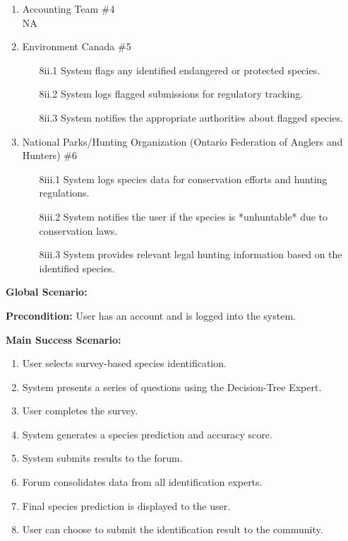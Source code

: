 \documentclass[]{article}
\begin{document}
\begin{enumerate}[{\bf BE1.}]
\begin{enumerate}[{\bf VP1.}]
    \item Accounting Team \#4 \\
    \newline NA

    \item Environment Canada \#5 \\
    \begin{enumerate}
        \item[8ii.1] System flags any identified endangered or protected species.
        \item[8ii.2] System logs flagged submissions for regulatory tracking.
        \item[8ii.3] System notifies the appropriate authorities about flagged species.
    \end{enumerate}

    \item National Parks/Hunting Organization (Ontario Federation of Anglers and Hunters) \#6 \\
    \begin{enumerate}
        \item [8iii.1] System logs species data for conservation efforts and hunting regulations.
        \item [8iii.2] System notifies the user if the species is *unhuntable* due to conservation laws.
        \item [8iii.3] System provides relevant legal hunting information based on the identified species.
    \end{enumerate}
\end{enumerate}

\textbf{Global Scenario:}

\textbf{Precondition:} User has an account and is logged into the system.

\textbf{Main Success Scenario:}
\begin{enumerate}
    \item User selects survey-based species identification.
    \item System presents a series of questions using the Decision-Tree Expert.
    \item User completes the survey.
    \item System generates a species prediction and accuracy score.
    \item System submits results to the forum.
    \item Forum consolidates data from all identification experts.
    \item Final species prediction is displayed to the user.
    \item User can choose to submit the identification result to the community.
\end{enumerate}


\end{enumerate}
\end{document}

